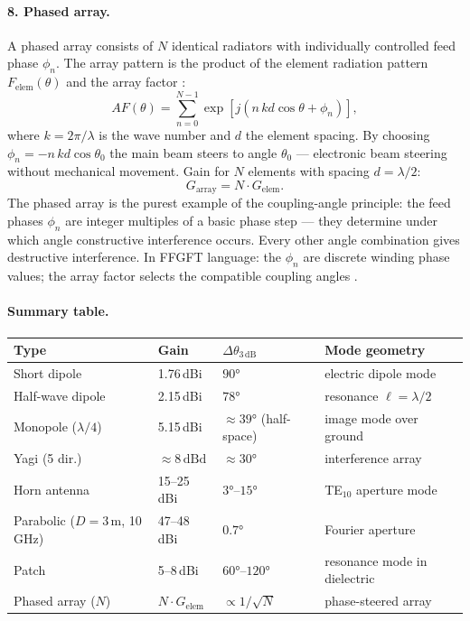 \paragraph{8. Phased array.}

A phased array consists of $N$ identical radiators with individually
controlled feed phase $\phi_n$. The array pattern is the product of the
element radiation pattern $F_\mathrm{elem}(\theta)$ and the array factor
\cite{Mailloux2017,Balanis2016}:
\[
  AF(\theta) = \sum_{n=0}^{N-1} \exp\!\left[j\left(n\,kd\cos\theta + \phi_n\right)\right],
\]
where $k = 2\pi/\lambda$ is the wave number and $d$ the element spacing.
By choosing $\phi_n = -n\,kd\cos\theta_0$ the main beam steers to angle
$\theta_0$ --- electronic beam steering without mechanical movement. Gain
for $N$ elements with spacing $d = \lambda/2$:
\[
  G_\mathrm{array} = N \cdot G_\mathrm{elem}.
\]
The phased array is the purest example of the coupling-angle principle:
the feed phases $\phi_n$ are integer multiples of a basic phase step ---
they determine under which angle constructive interference occurs. Every
other angle combination gives destructive interference. In FFGFT language:
the $\phi_n$ are discrete winding phase values; the array factor selects
the compatible coupling angles \SM.

\paragraph{Summary table.}

\begin{center}
\begin{tabular}{@{}llll@{}}
\toprule
\textbf{Type} & \textbf{Gain} & \textbf{$\Delta\theta_{3\,\mathrm{dB}}$}
             & \textbf{Mode geometry} \\
\midrule
Short dipole     & 1.76\,dBi  & $90°$         & electric dipole mode \\
Half-wave dipole & 2.15\,dBi & $78°$          & resonance $\ell=\lambda/2$ \\
Monopole ($\lambda/4$) & 5.15\,dBi & ${\approx}39°$ (half-space) & image mode over ground \\
Yagi (5 dir.)   & ${\approx}8\,\mathrm{dBd}$ & ${\approx}30°$ & interference array \\
Horn antenna    & 15--25\,dBi & $3°$--$15°$  & TE$_{10}$ aperture mode \\
Parabolic ($D=3\,\mathrm{m}$, 10\,GHz) & 47--48\,dBi & $0.7°$ & Fourier aperture \\
Patch           & 5--8\,dBi  & $60°$--$120°$ & resonance mode in dielectric \\
Phased array ($N$) & $N \cdot G_\mathrm{elem}$ & $\propto 1/\sqrt{N}$ & phase-steered array \\
\bottomrule
\end{tabular}
\end{center}

